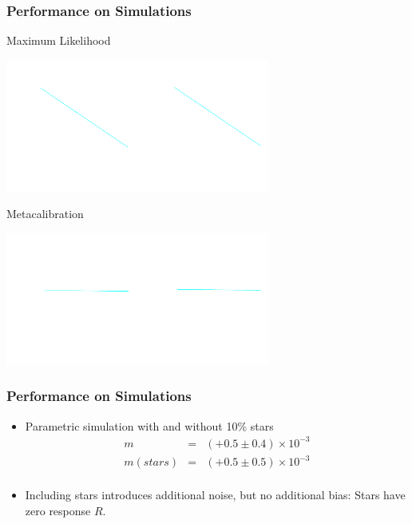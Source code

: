 \documentclass{beamer}
\begin{document}
\frame
{
    \frametitle{Performance on Simulations}
 
    {\normalsize Maximum Likelihood}
    \begin{center}
        \includegraphics[width=0.65\textwidth]{run-bd29mcal01-fit-m-c-nocorr-icolor.pdf}
    \end{center}

    {\normalsize Metacalibration}
    \begin{center}
        \includegraphics[width=0.65\textwidth]{run-bd29mcal01-fit-m-c-icolor.pdf}
    \end{center}

}



\frame
{
    \frametitle{Performance on Simulations}

 
    \begin{itemize}
            

        \item Parametric simulation with and without {\color{gold} 10\% stars}
             {\color{lightskyblue} 
                 \begin{eqnarray}
                     m        & = & (+0.5 \pm 0.4) \times 10^{-3} \nonumber \\
                     m(stars) & = & (+0.5 \pm 0.5) \times 10^{-3} \nonumber \\
                 \end{eqnarray}
             }

         \item Including stars introduces additional noise, but no
             additional bias: Stars have zero response {\color{gold} $R$}.

    \end{itemize}

}
\end{document}

